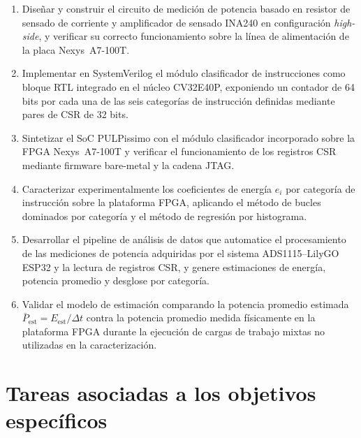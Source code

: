 \begin{enumerate}

    \item Diseñar y construir el circuito de medición de potencia basado en
          resistor de sensado de corriente y amplificador de sensado INA240
          en configuración \emph{high-side}, y verificar su correcto
          funcionamiento sobre la línea de alimentación de la placa Nexys~A7-100T.

    \item Implementar en SystemVerilog el módulo clasificador de instrucciones
          como bloque RTL integrado en el núcleo CV32E40P, exponiendo un
          contador de 64 bits por cada una de las seis categorías de
          instrucción definidas mediante pares de CSR de 32 bits.

    \item Sintetizar el SoC PULPissimo con el módulo clasificador incorporado
          sobre la FPGA Nexys~A7-100T y verificar el funcionamiento de los
          registros CSR mediante firmware bare-metal y la cadena JTAG.

    \item Caracterizar experimentalmente los coeficientes de energía $e_i$
          por categoría de instrucción sobre la plataforma FPGA, aplicando
          el método de bucles dominados por categoría y el método de regresión
          por histograma.

    \item Desarrollar el pipeline de análisis de datos que automatice el
          procesamiento de las mediciones de potencia adquiridas por el sistema
          ADS1115--LilyGO ESP32 y la lectura de registros CSR, y genere
          estimaciones de energía, potencia promedio y desglose por categoría.

    \item Validar el modelo de estimación comparando la potencia promedio estimada
          $\bar{P}_{\text{est}} = E_{\text{est}}/\Delta t$ contra la potencia promedio medida
          físicamente en la plataforma FPGA durante la ejecución de cargas de
          trabajo mixtas no utilizadas en la caracterización.

\end{enumerate}

\section{Tareas asociadas a los objetivos específicos}
\label{sec:tareas_objetivos}

